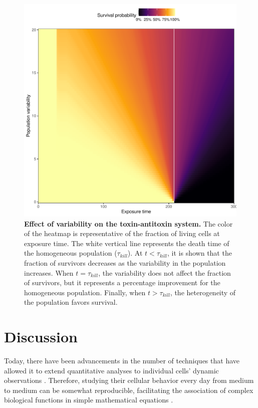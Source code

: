 \documentclass[a4paper, nobind]{templates/ociamthesis}
\begin{document}
\begin{figure}[H]
\includegraphics[width=1\linewidth]{downloadFigs4latex__main/survival-probability} \caption[Effect of variability on the toxin-antitoxin system.]{\textbf{Effect of variability on the toxin-antitoxin system.} The color of the heatmap is representative of the fraction of living cells at exposure time. The white vertical line represents the death time of the homogeneous population (\(\tau_{kill}\)). At \(t < \tau_{kill}\), it is shown that the fraction of survivors decreases as the variability in the population increases. When \(t = \tau_{kill}\), the variability does not affect the fraction of survivors, but it represents a percentage improvement for the homogeneous population. Finally, when \(t > \tau_{kill}\), the heterogeneity of the population favors survival.}\label{fig:survival-probability}
\end{figure}

\hypertarget{discussion-1}{%
\section{Discussion}\label{discussion-1}}

Today, there have been advancements in the number of techniques that have allowed it to extend quantitative analyses to individual cells' dynamic observations \autocite{camposConstantSizeExtension2014,meldrumFacultyOpinionsRecommendation2005,sliusarenkoHighthroughputSubpixelPrecision2011,taheri-araghiCellSizeControlHomeostasis2017,ursellRapidPreciseQuantification2017}. Therefore, studying their cellular behavior every day from medium to medium can be somewhat reproducible, facilitating the association of complex biological functions in simple mathematical equations \autocite{neidhardtBacterialGrowthConstant1999}.
\end{document}
